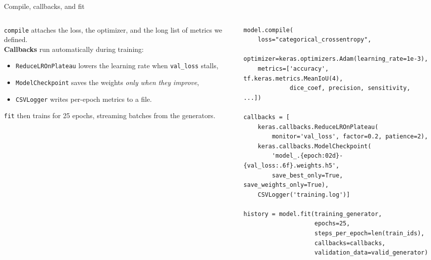 \documentclass[10pt,aspectratio=169]{beamer}
\begin{document}
\begin{frame}[fragile]{Compile, callbacks, and fit}
\begin{columns}[T,onlytextwidth]
\begin{column}{0.42\textwidth}
\small
\texttt{compile} attaches the loss, the optimizer, and the long list of metrics we defined.\\[0.4em]
\textbf{Callbacks} run automatically during training:
\begin{itemize}
  \item \texttt{ReduceLROnPlateau} lowers the learning rate when \texttt{val\_loss} stalls,
  \item \texttt{ModelCheckpoint} saves the weights \emph{only when they improve},
  \item \texttt{CSVLogger} writes per-epoch metrics to a file.
\end{itemize}
\texttt{fit} then trains for 25 epochs, streaming batches from the generators.
\end{column}
\begin{column}{0.56\textwidth}
\begin{lstlisting}[firstnumber=last]
model.compile(
    loss="categorical_crossentropy",
    optimizer=keras.optimizers.Adam(learning_rate=1e-3),
    metrics=['accuracy', tf.keras.metrics.MeanIoU(4),
             dice_coef, precision, sensitivity, ...])

callbacks = [
    keras.callbacks.ReduceLROnPlateau(
        monitor='val_loss', factor=0.2, patience=2),
    keras.callbacks.ModelCheckpoint(
        'model_.{epoch:02d}-{val_loss:.6f}.weights.h5',
        save_best_only=True, save_weights_only=True),
    CSVLogger('training.log')]

history = model.fit(training_generator,
                    epochs=25,
                    steps_per_epoch=len(train_ids),
                    callbacks=callbacks,
                    validation_data=valid_generator)
\end{lstlisting}
\end{column}
\end{columns}
\end{frame}
\end{document}
